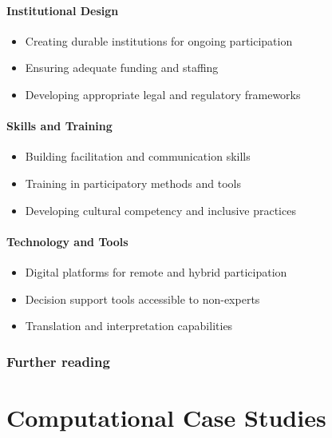 \documentclass[
  letterpaper,
  DIV=11,
  numbers=noendperiod]{scrreprt}
\providecommand{\tightlist}{%
  \setlength{\itemsep}{0pt}\setlength{\parskip}{0pt}}
\begin{document}
\subsection{Institutional Design}\label{institutional-design}

\begin{itemize}
\tightlist
\item
  Creating durable institutions for ongoing participation
\item
  Ensuring adequate funding and staffing
\item
  Developing appropriate legal and regulatory frameworks
\end{itemize}

\subsection{Skills and Training}\label{skills-and-training}

\begin{itemize}
\tightlist
\item
  Building facilitation and communication skills
\item
  Training in participatory methods and tools
\item
  Developing cultural competency and inclusive practices
\end{itemize}

\subsection{Technology and Tools}\label{technology-and-tools}

\begin{itemize}
\tightlist
\item
  Digital platforms for remote and hybrid participation
\item
  Decision support tools accessible to non-experts
\item
  Translation and interpretation capabilities
\end{itemize}

\section*{Further reading}\label{further-reading-20}


\part{\textbf{Computational Case Studies}}
\end{document}

